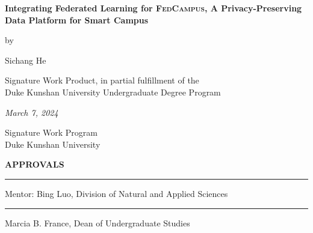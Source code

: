 \documentclass[11pt,a4paper,oneside]{report}
\newcommand{\fedcampus}{\textsc{FedCampus}\xspace}
\begin{document}
\newcommand{\authorname}{Sichang He}

\newcommand{\thetitle}{Integrating Federated Learning for \fedcampus,
    A Privacy-Preserving Data Platform for Smart Campus
}

\newcommand{\submissiondate}{March 7, 2024}

\newcommand{\mentor}{Bing Luo}

\newcommand{\academicunit}{Division of Natural and Applied Sciences}



\begin{titlepage}

    \vspace*{\bigskipamount}

    \begin{center}
        {\sffamily\LARGE\bfseries\MakeUppercase\thetitle\par}

        \bigskip

        by

        \bigskip

        {\Large \authorname}

        \bigskip

        Signature Work Product, in partial fulfillment of the \\
        Duke Kunshan University Undergraduate Degree Program

        \bigskip

        \emph{\submissiondate}

        \bigskip

        Signature Work Program \\
        Duke Kunshan University

    \end{center}

    \vfill

    \textbf{\textsf{APPROVALS}}

    \bigskip\bigskip\bigskip
    \hrule

    Mentor: \mentor, \academicunit

    \bigskip\bigskip\bigskip
    \hrule

    Marcia B. France, Dean of Undergraduate Studies

\end{titlepage}
\end{document}
